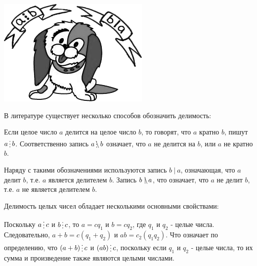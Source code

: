 
\begin{floatingfigure}[r]{0.2\textwidth}\setlength{\parindent}{0em}
	\includegraphics[scale=0.35]{./img/dog}
\end{floatingfigure}
В литературе существует несколько способов обозначить делимость:

Если целое число $a$ делится на целое число $b$, то говорят, что $a$ кратно $b$, пишут $a\del b$. Соответственно запись $a\ndel b$ означает, что $a$ не делится на $b$, или $a$ не кратно $b$. 


Наряду с такими обозначениями используются запись $b~|~a$, означающая, что $a$ делит $b$, т.е. $a$ является делителем $b$. Запись $b~\mathrlap{\backslash}|~a$, что означает, что $a$ не делит $b$, т.е. $a$ не является делителем $b$.


Делимость целых чисел обладает несколькими основными свойствами:


\begin{dok}
    Поскольку $a\del c$ и $b\del c$, то $a = cq_1$ и $b = cq_2$, где $q_1$ и $q_2$ - целые числа. Следовательно,  $a + b = c(q_1 + q_2)$ и $ab = c_2(q_1q_2)$. Что означает по определению, что $(a + b) \del c$ и $(ab) \del c$, поскольку если    $q_1$ и $q_2$ - целые числа, то их сумма и произведение также являются целыми числами. 
\end{dok}

